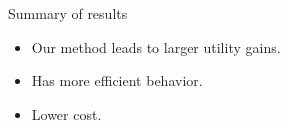 \documentclass{beamer}
\begin{document}
\begin{frame}{Summary of results}
    \begin{itemize}
        \item Our method leads to larger utility gains.
        \item Has more efficient behavior. 
        \item Lower cost.
    \end{itemize}
\end{frame}


\end{document}
